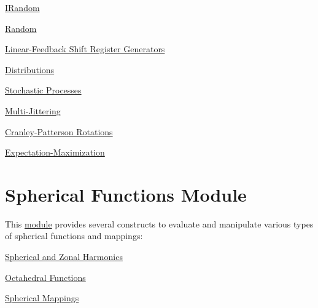 \begin{DoxyItemize}
\item \hyperlink{structcugar_1_1_i_random}{I\+Random}
\item \hyperlink{structcugar_1_1_random}{Random}
\item \hyperlink{group___l_f_s_r_module}{Linear-\/\+Feedback Shift Register Generators}
\item \hyperlink{group__distributions}{Distributions}
\item \hyperlink{group__processes}{Stochastic Processes}
\item \hyperlink{group__multijitter}{Multi-\/\+Jittering}
\item \hyperlink{group__cp__rotations}{Cranley-\/\+Patterson Rotations}
\item \hyperlink{group___expectation_maximization_module}{Expectation-\/\+Maximization} 
\end{DoxyItemize}\hypertarget{spherical_page}{}\section{Spherical Functions Module}\label{spherical_page}
\begin{DoxyParagraph}{}
This \hyperlink{group__spherical__functions}{module} provides several constructs to evaluate and manipulate various types of spherical functions and mappings\+:
\end{DoxyParagraph}

\begin{DoxyItemize}
\item \hyperlink{group__spherical__harmonics}{Spherical and Zonal Harmonics}
\item \hyperlink{group__octahedral__functions}{Octahedral Functions}
\item \hyperlink{group__spherical__mappings}{Spherical Mappings} 
\end{DoxyItemize}